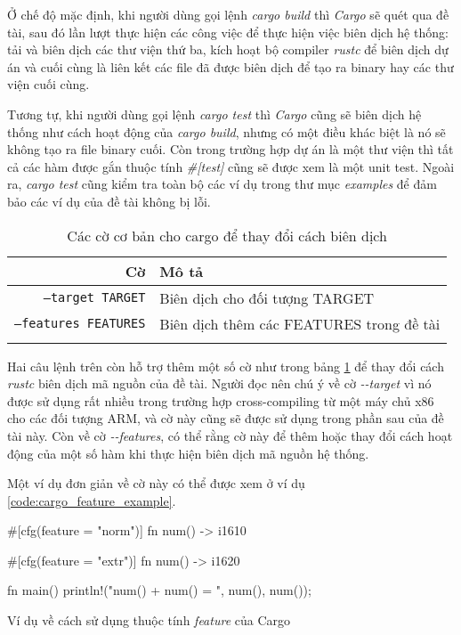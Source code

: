 Ở chế độ mặc định, khi người dùng gọi lệnh \emph{cargo build} thì \emph{Cargo} sẽ quét qua đề tài, sau đó lần lượt thực hiện các công việc để thực hiện việc biên dịch hệ thống: tải và biên dịch các thư viện thứ ba, kích hoạt bộ compiler \emph{rustc} để biên dịch dự án và cuối cùng là liên kết các file đã được biên dịch để tạo ra binary hay các thư viện cuối cùng.

Tương tự, khi người dùng gọi lệnh \emph{cargo test} thì \emph{Cargo} cũng sẽ biên dịch hệ thống như cách hoạt động của \emph{cargo build}, nhưng có một điều khác biệt là nó sẽ không tạo ra file binary cuối.
Còn trong trường hợp dự án là một thư viện thì tất cả các hàm được gắn thuộc tính \emph{\#[test]} cũng sẽ được xem là một unit test.
Ngoài ra, \emph{cargo test} cũng kiểm tra toàn bộ các ví dụ trong thư mục \emph{examples} để đảm bảo các ví dụ của đề tài không bị lỗi.

\begin{longtable}{r|l}
\textbf{Cờ} & \textbf{Mô tả} \\
\midrule
\endhead
\texttt{--target TARGET} & Biên dịch cho đối tượng TARGET \\
\texttt{--features FEATURES} & Biên dịch thêm các FEATURES trong đề tài \\
\bottomrule
\caption{Các cờ cơ bản cho cargo để thay đổi cách biên dịch}
\label{tbl:cargo_flags_example}
\end{longtable}

Hai câu lệnh trên còn hỗ trợ thêm một số cờ như trong bảng \ref{tbl:cargo_flags_example} để thay đổi cách \emph{rustc} biên dịch mã nguồn của đề tài.
Người đọc nên chú ý về cờ \emph{-{}-target} vì nó được sử dụng rất nhiều trong trường hợp cross-compiling từ một máy chủ x86 cho các đối tượng ARM, và cờ này cũng sẽ được sử dụng trong phần sau của đề tài này.
Còn về cờ \emph{-{}-features}, có thể rằng cờ này để thêm hoặc thay đổi cách hoạt động của một số hàm khi thực hiện biên dịch mã nguồn hệ thống.

Một ví dụ đơn giản về cờ này có thể được xem ở ví dụ \ref{code:cargo_feature_example}.

\begin{listing}
\begin{rustcode}
#[cfg(feature = "norm")]
fn num() -> i16{10}

#[cfg(feature = "extr")]
fn num() -> i16{20}

fn main() {
    println!("num() + num() = {} ", num(), num());
}
\end{rustcode}
\caption{Ví dụ về cách sử dụng thuộc tính \emph{feature} của Cargo}
\label{code:cargo_feature_example}
\end{listing}

